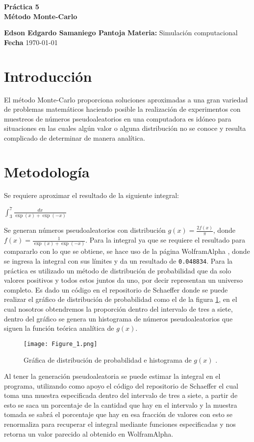 \documentclass[a4paper, 11pt]{article}
\begin{document}
\begin{center}
\LARGE \bf Pr\'actica 5\\ Método Monte-Carlo 
\end{center}

\vspace{1cm} 
\noindent\textbf {Edson Edgardo Samaniego Pantoja} \hfill \textbf{Materia:} Simulación computacional 
\hfill \\
\textbf{Fecha} \today  
\vspace{1cm} 

\section{Introducción}
El método Monte-Carlo proporciona soluciones aproximadas a una gran variedad de problemas matemáticos haciendo posible la realización de experimentos con muestreos de números pseudoaleatorios en una computadora es idóneo para situaciones en las cuales algún valor o alguna distribución no se conoce y resulta complicado de determinar de manera analítica.

\section{Metodología}
Se requiere aproximar el resultado de la siguiente integral:
\bigskip

$\int_3^7 \frac{dx}{\exp{(x)}+\exp{(-x)}}$
\bigskip

Se generan números pseudoaleatorios con distribución $g(x) = \frac{2f(x)}{\pi}$,  donde $f(x)= \frac{1}{\exp(x)+\exp(-x)}$.
Para la integral ya que se requiere el resultado para compararlo con lo que  se obtiene, se hace uso de la página WolframAlpha \cite{WA}, donde se ingresa la integral con sus límites y da un resultado de \texttt{0.048834}.
Para la práctica es utilizado un método de distribución de probabilidad que da solo valores positivos y todos estos juntos da uno, por decir representan un universo completo. Es dado un código en el repositorio de Schaeffer \cite{dra} donde se puede realizar el gráfico de distribución de probabilidad como el de la figura \ref{f1}, en el cual nosotros obtendremos la proporción dentro del intervalo de tres a siete, dentro del gráfico se genera un histograma de números pseudoaleatorios que siguen la función teórica analítica de $g(x)$.
\begin{figure}[H]
  \centering      
  \texttt{[image: Figure\_1.png]}
  \caption{Gráfica de distribución de probabilidad e histograma de $g(x)$ \cite{Edson}.}
  \label{f1}
\end{figure}
\bigskip
Al tener la generación pseudoaleatoria se puede estimar la integral en el programa, utilizando como apoyo el código del repositorio de Schaeffer \cite{dra} el cual toma una muestra especificada dentro del intervalo de tres a siete, a partir de esto se saca un porcentaje de la cantidad que hay en el intervalo y la muestra tomada se sabrá el porcentaje que hay en esa fracción de valores con esto se renormaliza para recuperar el integral mediante funciones especificadas y nos retorna un valor parecido al obtenido en WolframAlpha.
\end{document}

